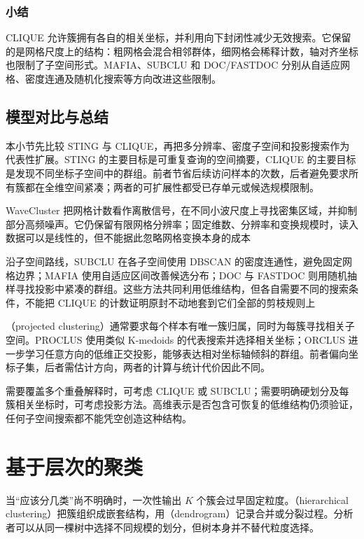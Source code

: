 \subsubsection{小结}

CLIQUE 允许簇拥有各自的相关坐标，并利用向下封闭性减少无效搜索。它保留的是网格尺度上的结构：粗网格会混合相邻群体，细网格会稀释计数，轴对齐坐标也限制了子空间形式。MAFIA、SUBCLU 和 DOC/FASTDOC 分别从自适应网格、密度连通及随机化搜索等方向改进这些限制。

\subsection{模型对比与总结}

本小节先比较 STING 与 CLIQUE，再把多分辨率、密度子空间和投影搜索作为代表性扩展。STING 的主要目标是可重复查询的空间摘要，CLIQUE 的主要目标是发现不同坐标子空间中的群组。前者节省后续访问样本的次数，后者避免要求所有簇都在全维空间紧凑；两者的可扩展性都受已存单元或候选规模限制。

WaveCluster 把网格计数看作离散信号，在不同小波尺度上寻找密集区域，并抑制部分高频噪声。它仍保留有限网格分辨率；固定维数、分辨率和变换规模时，读入数据可以是线性的，但不能据此忽略网格变换本身的成本

沿子空间路线，SUBCLU 在各子空间使用 DBSCAN 的密度连通性，避免固定网格边界；MAFIA 使用自适应区间改善候选分布；DOC 与 FASTDOC 则用随机抽样寻找投影中紧凑的群组。这些方法共同利用低维结构，但各自需要不同的搜索条件，不能把 CLIQUE 的计数证明原封不动地套到它们全部的剪枝规则上

（projected clustering）通常要求每个样本有唯一簇归属，同时为每簇寻找相关子空间。PROCLUS 使用类似 K-medoids 的代表搜索并选择相关坐标；ORCLUS 进一步学习任意方向的低维正交投影，能够表达相对坐标轴倾斜的群组。前者偏向坐标子集，后者需估计方向，两者的计算与统计代价因此不同。

需要覆盖多个重叠解释时，可考虑 CLIQUE 或 SUBCLU；需要明确硬划分及每簇相关坐标时，可考虑投影方法。高维表示是否包含可恢复的低维结构仍须验证，任何子空间搜索都不能凭空创造这种结构。

\section{基于层次的聚类}
\label{sec:clustering-hierarchy}

当“应该分几类”尚不明确时，一次性输出 $K$ 个簇会过早固定粒度。（hierarchical clustering）把簇组织成嵌套结构，用（dendrogram）记录合并或分裂过程。分析者可以从同一棵树中选择不同规模的划分，但树本身并不替代粒度选择。

